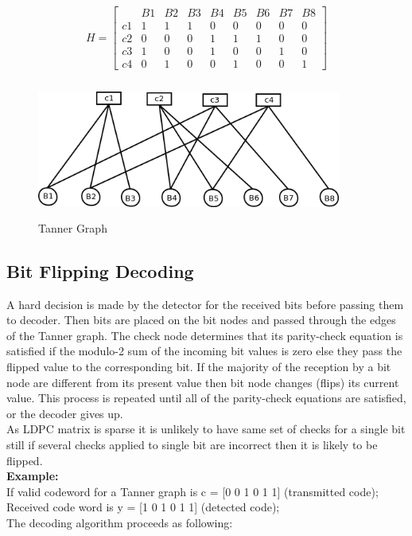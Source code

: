 \documentclass[twopage,12pt,a4paper]{report}
\begin{document}
\begin{raggedright}
\[
 H =  \left[ \begin{array} {c|cccccccc} 
  &    B1 &   B2 &   B3 &  B4  &  B5  &  B6  &  B7  &  B8 \\ \hline
c1 &    1  &   1  &   1  &   0  &   0  &   0  &   0  &   0 \\
c2 &    0  &   0  &   0  &   1  &   1  &   1  &   0  &   0 \\ 
c3 &    1  &   0  &   0  &   1  &   0  &   0  &   1  &   0 \\
c4 &    0  &   1  &   0  &   0  &   1  &   0  &   0  &   1 \end{array} \right] 
\]			

\begin{figure}[h!]
\centering
\includegraphics[height=4.5cm,width=10cm]{minSum1}
\caption{ Tanner Graph }
\end{figure}



\subsection{Bit Flipping Decoding} 


 A hard decision is made by the detector for the received bits before passing them to decoder.
Then bits are placed on the bit nodes and passed through the edges of the Tanner graph.
The check node determines that its parity-check equation is satisfied if the modulo-2 sum of the incoming bit values is zero else they pass the flipped value to the corresponding bit.
If the majority of the reception by a bit node are different from its present value then bit node changes (flips) its current value.
This process is repeated until all of the parity-check equations are satisfied, or the decoder gives up.\\
As LDPC matrix is sparse it is unlikely to have same set of checks for a single bit still if several checks applied to single bit are incorrect then it is likely to be flipped. \\
\textbf{Example:} \\
If valid codeword for a Tanner graph is c = [0 0 1 0 1 1] (transmitted code); \\
Received code word is y = [1 0 1 0 1 1] (detected code);\\
The decoding algorithm proceeds as following:


\end{raggedright}
\end{document}
